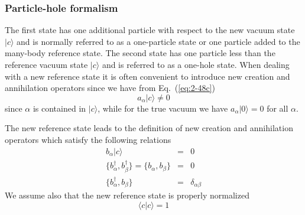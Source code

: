 \documentclass{beamer}
\begin{document}
\begin{frame}
\frametitle{Particle-hole formalism}

\begin{block}{}
The first state has one additional particle with respect to the new vacuum state
$|c\rangle $  and is normally referred to as a one-particle state or one particle added to the 
many-body reference state. 
The second state has one particle less than the reference vacuum state  $|c\rangle $ and is referred to as
a one-hole state. 
When dealing with a new reference state it is often convenient to introduce 
new creation and annihilation operators since we have 
from Eq.~(\ref{eq:2-48c})
\begin{equation}
	a_\alpha |c\rangle  \neq 0 \label{eq:2-49}
\end{equation}
since  $\alpha$ is contained  in $|c\rangle $, while for the true vacuum we have 
$a_\alpha |0\rangle  = 0$ for all $\alpha$.

The new reference state leads to the definition of new creation and annihilation operators
which satisfy the following relations
\begin{eqnarray}
	b_\alpha |c\rangle  &=& 0 \label{eq:2-50a} \\
	\{b_\alpha^\dagger , b_\beta^\dagger \} = \{b_\alpha , b_\beta \} &=& 0 \nonumber  \\
	\{b_\alpha^\dagger , b_\beta \} &=& \delta_{\alpha \beta} \label{eq:2-50c}
\end{eqnarray}
We assume also that the new reference state is properly normalized
\begin{equation}
	\langle c | c \rangle = 1 \label{eq:2-51}
\end{equation}
\end{block}
\end{frame}
\end{document}
